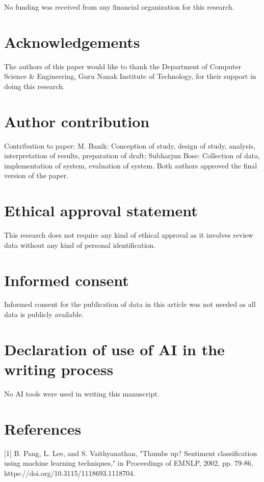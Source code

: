 \documentclass[11pt,a4paper]{article}
\begin{document}
No funding was received from any financial organization for this research.

\section*{Acknowledgements}

The authors of this paper would like to thank the Department of Computer Science & Engineering, Guru Nanak Institute of Technology, for their support in doing this research.

\section*{Author contribution}

Contribution to paper:
M. Banik: Conception of study, design of study, analysis, interpretation of results, preparation of draft; Subharjun Bose: Collection of data, implementation of system, evaluation of system. Both authors approved the final version of the paper.

\section*{Ethical approval statement}

This research does not require any kind of ethical approval as it involves review data without any kind of personal identification.

\section*{Informed consent}

Informed consent for the publication of data in this article was not needed as all data is publicly available. 

\section*{Declaration of use of AI in the writing process}

No AI tools were used in writing this manuscript.

\section*{References}

[1] B. Pang, L. Lee, and S. Vaithyanathan, "Thumbs up? Sentiment classification using machine learning techniques," in Proceedings of EMNLP, 2002, pp. 79-86, https://doi.org/10.3115/1118693.1118704.
\end{document}
